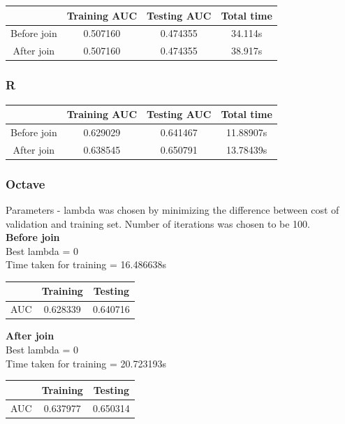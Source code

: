 \documentclass[10pt]{article}
\begin{document}
\begin{center}
 \begin{tabular}{|c | c | c | c||} 
 \hline
 & Training AUC & Testing AUC & Total time\\ [0.5ex]
 \hline\hline
Before join & 0.507160 & 0.474355 & 34.114s\\
 \hline
After join & 0.507160 & 0.474355 & 38.917s\\ 
 \hline
\end{tabular}
\end{center}

\subsubsection{R}

\begin{center}
 \begin{tabular}{|c | c | c | c||} 
 \hline
 & Training AUC & Testing AUC & Total time\\ [0.5ex]
 \hline\hline
Before join & 0.629029 & 0.641467 & 11.88907s\\
 \hline
After join & 0.638545 & 0.650791 & 13.78439s\\ 
 \hline
\end{tabular}
\end{center}

\subsubsection{Octave}
Parameters - lambda was chosen by minimizing the difference between cost of validation and training set. Number of iterations was chosen to be 100.\\
\textbf{Before join}\\
	Best lambda = 0 \\
	Time taken for training = 16.486638s

\begin{center}
 \begin{tabular}{|c | c | c ||} 
 \hline
 & Training & Testing\\ [0.5ex] 
 \hline\hline
AUC & 0.628339 & 0.640716\\
 \hline
\end{tabular}
\end{center}
\textbf{After join}\\
	Best lambda = 0\\
	Time taken for training = 20.723193s
\begin{center}
 \begin{tabular}{|c | c | c ||} 
 \hline
 & Training & Testing\\ [0.5ex] 
 \hline\hline
AUC & 0.637977 & 0.650314\\
 \hline
\end{tabular}
\end{center}
\end{document}
